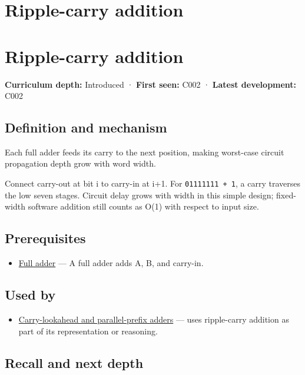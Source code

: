 \hypertarget{appendix-17917d9fdbe3}{}
\section*{Ripple-carry addition}
\section{Ripple-carry addition}\label{ripple-carry-addition}

\textbf{Curriculum depth:} Introduced · \textbf{First seen:} C002 · \textbf{Latest development:} C002

\subsection{Definition and mechanism}\label{definition-and-mechanism}

Each full adder feeds its carry to the next position, making worst-case circuit propagation depth grow with word width.

Connect carry-out at bit i to carry-in at i+1. For \texttt{01111111\ +\ 1}, a carry traverses the low seven stages. Circuit delay grows with width in this simple design; fixed-width software addition still counts as O(1) with respect to input size.

\subsection{Prerequisites}\label{prerequisites}

\begin{itemize}
\tightlist
\item
  \hyperref[appendix-d1a5b1e520c2]{Full adder} --- A full adder adds A, B, and carry-in.
\end{itemize}

\subsection{Used by}\label{used-by}

\begin{itemize}
\tightlist
\item
  \hyperref[appendix-b5c46b2d94ff]{Carry-lookahead and parallel-prefix adders} --- uses ripple-carry addition as part of its representation or reasoning.
\end{itemize}

\subsection{Recall and next depth}\label{recall-and-next-depth}

